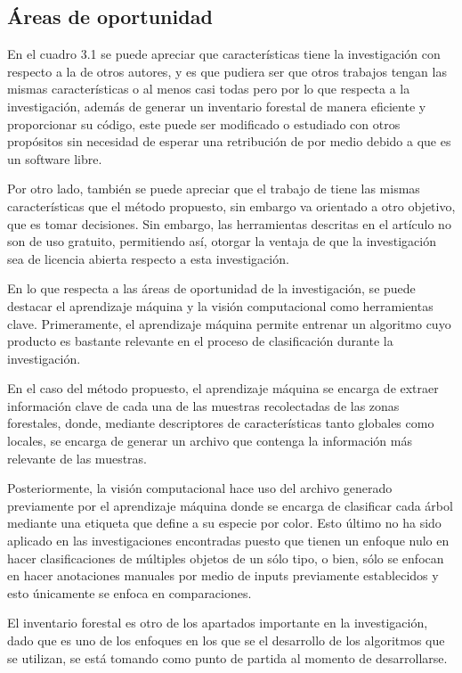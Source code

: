 \subsection{Áreas de oportunidad}
En el cuadro 3.1 se puede apreciar que características tiene la investigación con respecto a la de otros autores, y es que pudiera ser que otros trabajos tengan las mismas características o al menos casi todas pero por lo que respecta a la investigación, además de generar un inventario forestal de manera eficiente y proporcionar su código, este puede ser modificado o estudiado con otros propósitos sin necesidad de esperar una retribución de por medio debido a que es un software libre.

Por otro lado, también se puede apreciar que el trabajo de \citet{rf10} tiene las mismas características que el método propuesto, sin embargo va orientado a otro objetivo, que es tomar decisiones. Sin embargo, las herramientas descritas en el artículo no son de uso gratuito, permitiendo así, otorgar la ventaja de que la investigación sea de licencia abierta respecto a esta investigación.

En lo que respecta a las áreas de oportunidad de la investigación, se puede destacar el aprendizaje máquina y la visión computacional como herramientas clave. Primeramente, el aprendizaje máquina permite entrenar un algoritmo cuyo producto es bastante relevante en el proceso de clasificación durante la investigación.

En el caso del método propuesto, el aprendizaje máquina se encarga de extraer información clave de cada una de las muestras recolectadas de las zonas forestales, donde, mediante descriptores de características tanto globales como locales, se encarga de generar un archivo que contenga la información más relevante de las muestras.

Posteriormente, la visión computacional hace uso del archivo generado previamente por el aprendizaje máquina donde se encarga de clasificar cada árbol mediante una etiqueta que define a su especie por color. Esto último no ha sido aplicado en las investigaciones encontradas puesto que tienen un enfoque nulo en hacer clasificaciones de múltiples objetos de un sólo tipo, o bien, sólo se enfocan en hacer anotaciones manuales por medio de inputs previamente establecidos y esto únicamente se enfoca en comparaciones.

El inventario forestal es otro de los apartados importante en la investigación, dado que es uno de los enfoques en los que se el desarrollo de los algoritmos que se utilizan, se está tomando como punto de partida al momento de desarrollarse. 

